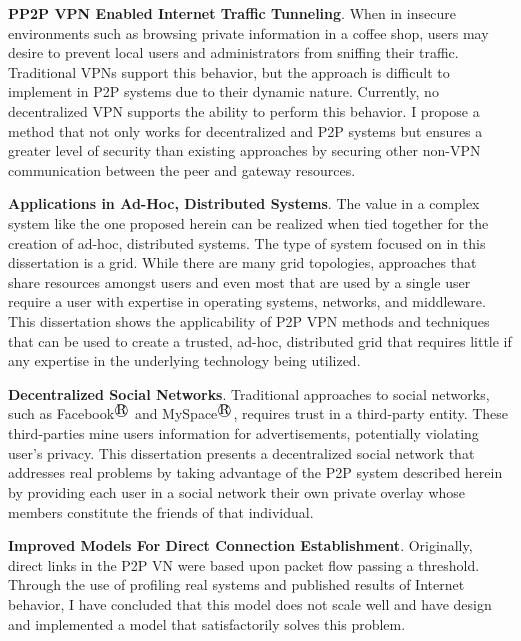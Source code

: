 {\bf PP2P VPN Enabled Internet Traffic Tunneling}. When in insecure
environments such as browsing private information in a coffee shop, users may
desire to prevent local users and administrators from sniffing their traffic.
Traditional VPNs support this behavior, but the approach is difficult to
implement in P2P systems due to their dynamic nature.  Currently, no
decentralized VPN supports the ability to perform this behavior.  I propose a
method that not only works for decentralized and P2P systems but ensures a
greater level of security than existing approaches by securing other non-VPN
communication between the peer and gateway resources.

{\bf Applications in Ad-Hoc, Distributed Systems}. The value in a complex
system like the one proposed herein can be realized when tied together for the
creation of ad-hoc, distributed systems.  The type of system focused on in this
dissertation is a grid.  While there are many grid topologies, approaches that
share resources amongst users and even most that are used by a single user
require a user with expertise in operating systems, networks, and middleware.
This dissertation shows the applicability of P2P VPN methods and techniques
that can be used to create a trusted, ad-hoc, distributed grid that requires
little if any expertise in the underlying technology being utilized.

{\bf Decentralized Social Networks}. Traditional approaches to social networks,
such as Facebook$^\registered$ and MySpace$^\registered$, requires trust in a third-party entity.  These
third-parties mine users information for advertisements, potentially violating
user's privacy.  This dissertation presents a decentralized social network that
addresses real problems by taking advantage of the P2P system described herein
by providing each user in a social network their own private overlay whose
members constitute the friends of that individual.

{\bf Improved Models For Direct Connection Establishment}.  Originally, direct
links in the P2P VN were based upon packet flow passing a threshold.  Through
the use of profiling real systems and published results of Internet behavior, I
have concluded that this model does not scale well and have design and
implemented a model that satisfactorily solves this problem.

